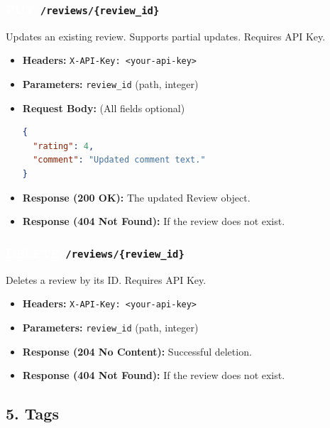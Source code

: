 \documentclass[11pt,a4paper]{article}
\newcommand{\methodPUT}{\colorbox{putcolor}{\textcolor{white}{\textbf{PUT}}}}
\newcommand{\methodDELETE}{\colorbox{deletecolor}{\textcolor{white}{\textbf{DELETE}}}}
\begin{document}
\subsubsection*{\methodPUT \texttt{ /reviews/\{review\_id\}}}
Updates an existing review. Supports partial updates. Requires API Key.
\begin{itemize}[label=\textcolor{primary}{\textbullet}, noitemsep]
    \item \textbf{Headers:} \texttt{X-API-Key: <your-api-key>}
    \item \textbf{Parameters:} \texttt{review\_id} (path, integer)
    \item \textbf{Request Body:} (All fields optional)
\begin{lstlisting}[language=json]
{
  "rating": 4,
  "comment": "Updated comment text."
}
\end{lstlisting}
    \item \textbf{Response (200 OK):} The updated Review object.
    \item \textbf{Response (404 Not Found):} If the review does not exist.
\end{itemize}

\subsubsection*{\methodDELETE \texttt{ /reviews/\{review\_id\}}}
Deletes a review by its ID. Requires API Key.
\begin{itemize}[label=\textcolor{primary}{\textbullet}, noitemsep]
    \item \textbf{Headers:} \texttt{X-API-Key: <your-api-key>}
    \item \textbf{Parameters:} \texttt{review\_id} (path, integer)
    \item \textbf{Response (204 No Content):} Successful deletion.
    \item \textbf{Response (404 Not Found):} If the review does not exist.
\end{itemize}

\subsection{5. Tags}
\end{document}
